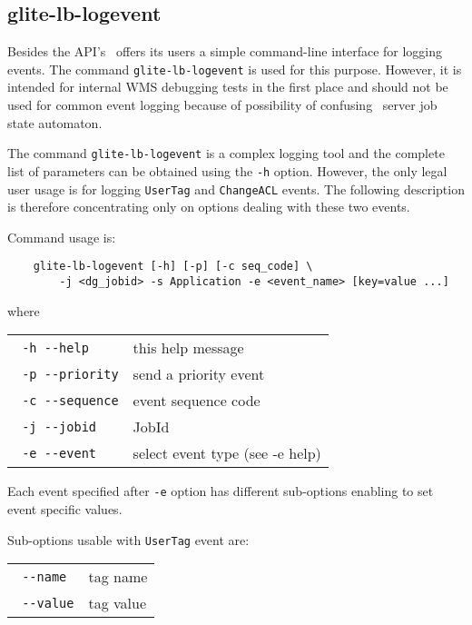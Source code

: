 \subsection{glite-lb-logevent}
\label{glite-lb-logevent}

Besides the API's \LB\ offers its users a simple command-line interface for
logging events. The command \verb'glite-lb-logevent' is used for this purpose.
However, it is intended for internal WMS debugging tests in the first place and
should not be used for common event logging because of possibility of confusing
\LB\ server job state automaton.

The command \verb'glite-lb-logevent' is a complex logging tool and the complete
list of parameters can be obtained using the \verb'-h' option. However,
the only legal user usage is for logging \verb'UserTag' and \verb'ChangeACL'
events. The following description is therefore concentrating only on options
dealing with these two events.

Command usage is:

\begin{verbatim}
    glite-lb-logevent [-h] [-p] [-c seq_code] \
        -j <dg_jobid> -s Application -e <event_name> [key=value ...]
\end{verbatim}

where

\begin{tabularx}{\textwidth}{lX}
\texttt{  -h  -{}-help} &           this help message\\
\texttt{  -p  -{}-priority} &       send a priority event\\
\texttt{  -c  -{}-sequence} &       event sequence code\\
\texttt{  -j  -{}-jobid} &          JobId\\
\texttt{  -e  -{}-event} &           select event type (see -e help)\\
\end{tabularx}

\medskip

Each event specified after \verb'-e' option has different sub-options enabling
to set event specific values.

Sub-options usable with \verb'UserTag' event are:


\begin{tabularx}{\textwidth}{lX}
\texttt{      -{}-name}  &          tag name\\
\texttt{      -{}-value} &          tag value\\
\end{tabularx}

